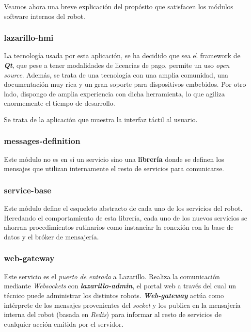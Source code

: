 Veamos ahora una breve explicación del propósito que satisfacen los módulos software internos del robot.

\subsubsection{lazarillo-hmi}

La tecnología usada por esta aplicación, se ha decidido que sea el framework de \textbf{\textit{Qt}}, que pese a tener modalidades de licencias de pago, permite un uso \textit{open source}. Además, se trata de una tecnología con una amplia comunidad, una documentación muy rica y un gran soporte para dispositivos embebidos. Por otro lado, dispongo de amplia experiencia con dicha herramienta, lo que agiliza enormemente el tiempo de desarrollo.

Se trata de la aplicación que muestra la interfaz táctil al usuario.

\subsubsection{messages-definition}

Este módulo no es en sí un servicio sino una \textbf{librería} donde se definen los mensajes que utilizan internamente el resto de servicios para comunicarse.

\subsubsection{service-base}

Este módulo define el esqueleto abstracto de cada uno de los servicios del robot. Heredando el comportamiento de esta librería, cada uno de los nuevos servicios se ahorran procedimientos rutinarios como instanciar la conexión con la base de datos y el bróker de mensajería.

\subsubsection{web-gateway}

Este servicio es el \textit{puerto de entrada} a Lazarillo. Realiza la comunicación mediante \textit{Websockets} con \textbf{\textit{lazarillo-admin}}, el portal web a través del cual un técnico puede administrar los distintos robots. \textit{\textbf{Web-gateway}} actúa como intérprete de los mensajes provenientes del \textit{socket} y los publica en la mensajería interna del robot (basada en \textit{Redis}) para informar al resto de servicios de cualquier acción emitida por el servidor.


